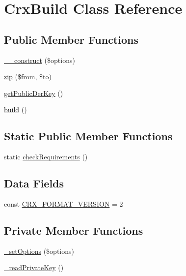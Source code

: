 \hypertarget{a00021}{}\section{Crx\+Build Class Reference}
\label{a00021}
\subsection*{Public Member Functions}
\begin{DoxyCompactItemize}
\item 
\hyperlink{a00021_ae8b8e1144b807ac13f20a916fd073b32}{\+\_\+\+\_\+construct} (\$options)
\item 
\hyperlink{a00021_aa41f94717e5e2ca6f60bfda8ef61a331}{zip} (\$from, \$to)
\item 
\hyperlink{a00021_aa601c5e69abfbc67106f5bde0f1ca81a}{get\+Public\+Der\+Key} ()
\item 
\hyperlink{a00021_a3928875ef0ceb18a51c1061be3eb3a00}{build} ()
\end{DoxyCompactItemize}
\subsection*{Static Public Member Functions}
\begin{DoxyCompactItemize}
\item 
static \hyperlink{a00021_abc40524a7532c15e64d949e89cbd5c1a}{check\+Requirements} ()
\end{DoxyCompactItemize}
\subsection*{Data Fields}
\begin{DoxyCompactItemize}
\item 
const \hyperlink{a00021_aad73019f97319636632f3428710e0221}{C\+R\+X\+\_\+\+F\+O\+R\+M\+A\+T\+\_\+\+V\+E\+R\+S\+I\+O\+N} = 2
\end{DoxyCompactItemize}
\subsection*{Private Member Functions}
\begin{DoxyCompactItemize}
\item 
\hyperlink{a00021_a61c856a8dcb16fb23e8bba19364f748c}{\+\_\+set\+Options} (\$options)
\item 
\hyperlink{a00021_a67bc545916848f8b958a9c030edf79fa}{\+\_\+read\+Private\+Key} ()
\end{DoxyCompactItemize}
